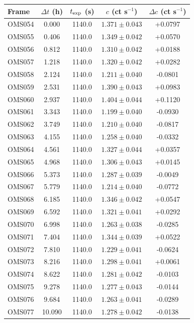 \begin{table}[t]
\centering
\small
\setlength{\tabcolsep}{3pt}
\renewcommand{\arraystretch}{1.03}
\begin{tabular}{lcccc}
\toprule
Frame & $\Delta t$ (h) & $t_{\rm exp}$ (s) & $c$ (ct s$^{-1}$) & $\Delta c$ (ct s$^{-1}$) \\
\midrule
OMS054 & 0.000 & 1140.0 & $1.371 \pm 0.043$ & +0.0797 \\
OMS055 & 0.406 & 1140.0 & $1.349 \pm 0.042$ & +0.0570 \\
OMS056 & 0.812 & 1140.0 & $1.310 \pm 0.042$ & +0.0188 \\
OMS057 & 1.218 & 1140.0 & $1.320 \pm 0.042$ & +0.0282 \\
OMS058 & 2.124 & 1140.0 & $1.211 \pm 0.040$ & -0.0801 \\
OMS059 & 2.531 & 1140.0 & $1.390 \pm 0.043$ & +0.0983 \\
OMS060 & 2.937 & 1140.0 & $1.404 \pm 0.044$ & +0.1120 \\
OMS061 & 3.343 & 1140.0 & $1.199 \pm 0.040$ & -0.0930 \\
OMS062 & 3.749 & 1140.0 & $1.210 \pm 0.040$ & -0.0817 \\
OMS063 & 4.155 & 1140.0 & $1.258 \pm 0.040$ & -0.0332 \\
OMS064 & 4.561 & 1140.0 & $1.327 \pm 0.044$ & +0.0357 \\
OMS065 & 4.968 & 1140.0 & $1.306 \pm 0.043$ & +0.0145 \\
OMS066 & 5.373 & 1140.0 & $1.287 \pm 0.039$ & -0.0049 \\
OMS067 & 5.779 & 1140.0 & $1.214 \pm 0.040$ & -0.0772 \\
OMS068 & 6.185 & 1140.0 & $1.346 \pm 0.042$ & +0.0547 \\
OMS069 & 6.592 & 1140.0 & $1.321 \pm 0.041$ & +0.0292 \\
OMS070 & 6.998 & 1140.0 & $1.263 \pm 0.038$ & -0.0285 \\
OMS071 & 7.404 & 1140.0 & $1.344 \pm 0.039$ & +0.0522 \\
OMS072 & 7.810 & 1140.0 & $1.229 \pm 0.041$ & -0.0624 \\
OMS073 & 8.216 & 1140.0 & $1.298 \pm 0.041$ & +0.0061 \\
OMS074 & 8.622 & 1140.0 & $1.281 \pm 0.042$ & -0.0103 \\
OMS075 & 9.278 & 1140.0 & $1.277 \pm 0.043$ & -0.0144 \\
OMS076 & 9.684 & 1140.0 & $1.263 \pm 0.041$ & -0.0289 \\
OMS077 & 10.090 & 1140.0 & $1.278 \pm 0.042$ & -0.0138 \\

\end{tabular}
\end{table}
